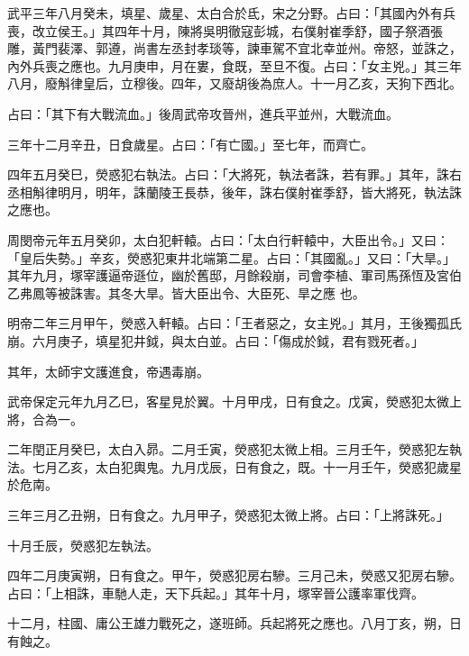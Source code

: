 \begin{pinyinscope}
 武平三年八月癸未，填星、歲星、太白合於氐，宋之分野。占曰：「其國內外有兵喪，改立侯王。」其四年十月，陳將吳明徹寇彭城，右僕射崔季舒，國子祭酒張雕，黃門裴澤、郭遵，尚書左丞封孝琰等，諫車駕不宜北幸並州。帝怒，並誅之，內外兵喪之應也。九月庚申，月在婁，食既，至旦不復。占曰：「女主兇。」其三年八月，廢斛律皇后，立穆後。四年，又廢胡後為庶人。十一月乙亥，天狗下西北。



 占曰：「其下有大戰流血。」後周武帝攻晉州，進兵平並州，大戰流血。



 三年十二月辛丑，日食歲星。占曰：「有亡國。」至七年，而齊亡。



 四年五月癸巳，熒惑犯右執法。占曰：「大將死，執法者誅，若有罪。」其年，誅右丞相斛律明月，明年，誅蘭陵王長恭，後年，誅右僕射崔季舒，皆大將死，執法誅之應也。



 周閔帝元年五月癸卯，太白犯軒轅。占曰：「太白行軒轅中，大臣出令。」又曰：「皇后失勢。」辛亥，熒惑犯東井北端第二星。占曰：「其國亂。」又曰：「大旱。」其年九月，塚宰護逼帝遜位，幽於舊邸，月餘殺崩，司會李植、軍司馬孫恆及宮伯乙弗鳳等被誅害。其冬大旱。皆大臣出令、大臣死、旱之應
 也。



 明帝二年三月甲午，熒惑入軒轅。占曰：「王者惡之，女主兇。」其月，王後獨孤氏崩。六月庚子，填星犯井鉞，與太白並。占曰：「傷成於鉞，君有戮死者。」



 其年，太師宇文護進食，帝遇毒崩。



 武帝保定元年九月乙巳，客星見於翼。十月甲戌，日有食之。戊寅，熒惑犯太微上將，合為一。



 二年閏正月癸巳，太白入昴。二月壬寅，熒惑犯太微上相。三月壬午，熒惑犯左執法。七月乙亥，太白犯輿鬼。九月戊辰，日有食之，既。十一月壬午，熒惑犯歲星於危南。



 三年三月乙丑朔，日有食之。九月甲子，熒惑犯太微上將。占曰：「上將誅死。」



 十月壬辰，熒惑犯左執法。



 四年二月庚寅朔，日有食之。甲午，熒惑犯房右驂。三月己未，熒惑又犯房右驂。占曰：「上相誅，車馳人走，天下兵起。」其年十月，塚宰晉公護率軍伐齊。



 十二月，柱國、庸公王雄力戰死之，遂班師。兵起將死之應也。八月丁亥，朔，日有蝕之。




\end{pinyinscope}
